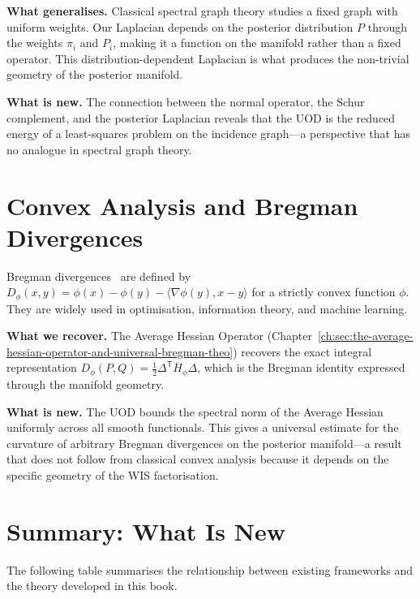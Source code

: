 \textbf{What generalises.}
Classical spectral graph theory studies a fixed graph with uniform
weights.  Our Laplacian depends on the posterior distribution $P$
through the weights $\pi_i$ and $P_i$, making it a function on the
manifold rather than a fixed operator.  This distribution-dependent
Laplacian is what produces the non-trivial geometry of the posterior
manifold.

\textbf{What is new.}
The connection between the normal operator, the Schur complement,
and the posterior Laplacian reveals that the UOD is the reduced
energy of a least-squares problem on the incidence graph---a
perspective that has no analogue in spectral graph theory.

\section{Convex Analysis and Bregman Divergences}\label{ch:sec:comparison-bregman}

Bregman divergences~\cite{bregman1967relaxation} are defined by
$D_\phi(x,y)=\phi(x)-\phi(y)-\langle\nabla\phi(y),x-y\rangle$ for
a strictly convex function $\phi$.  They are widely used in
optimisation, information theory, and machine learning.

\textbf{What we recover.}
The Average Hessian Operator (Chapter~\ref{ch:sec:the-average-hessian-operator-and-universal-bregman-theo})
recovers the exact integral representation
$D_\phi(P,Q)=\frac{1}{2}\Delta^{\mathsf T}\overline H_\phi\Delta$,
which is the Bregman identity expressed through the manifold geometry.

\textbf{What is new.}
The UOD bounds the spectral norm of the Average Hessian uniformly
across all smooth functionals.  This gives a universal estimate for
the curvature of arbitrary Bregman divergences on the posterior
manifold---a result that does not follow from classical convex
analysis because it depends on the specific geometry of the WIS
factorisation.

\section{Summary: What Is New}\label{ch:sec:comparison-summary}

The following table summarises the relationship between existing
frameworks and the theory developed in this book.

